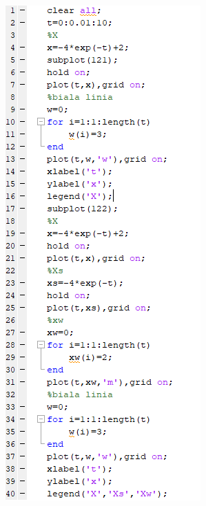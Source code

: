 \documentclass{article}
\begin{document}
\begin{figure}
    \centering
    \includegraphics{kod2.png}
    \label{fig:my_label}
\end{figure}
\end{document}
